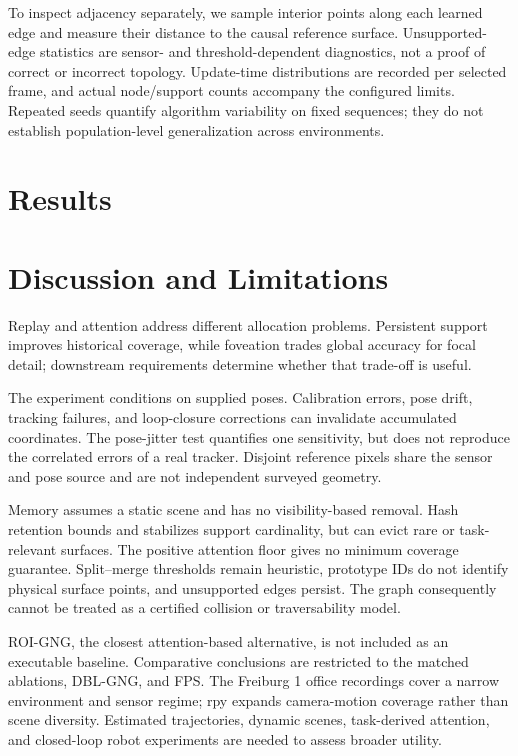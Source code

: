 \documentclass[letterpaper,10pt,conference]{template/ieeeconf}
\begin{document}
To inspect adjacency separately, we sample interior points along each learned edge and measure their distance to the causal reference surface. Unsupported-edge statistics are sensor- and threshold-dependent diagnostics, not a proof of correct or incorrect topology. Update-time distributions are recorded per selected frame, and actual node/support counts accompany the configured limits. Repeated seeds quantify algorithm variability on fixed sequences; they do not establish population-level generalization across environments.

\section{Results}


\section{Discussion and Limitations}
Replay and attention address different allocation problems. Persistent support improves historical coverage, while foveation trades global accuracy for focal detail; downstream requirements determine whether that trade-off is useful.

The experiment conditions on supplied poses. Calibration errors, pose drift, tracking failures, and loop-closure corrections can invalidate accumulated coordinates. The pose-jitter test quantifies one sensitivity, but does not reproduce the correlated errors of a real tracker. Disjoint reference pixels share the sensor and pose source and are not independent surveyed geometry.

Memory assumes a static scene and has no visibility-based removal. Hash retention bounds and stabilizes support cardinality, but can evict rare or task-relevant surfaces. The positive attention floor gives no minimum coverage guarantee. Split--merge thresholds remain heuristic, prototype IDs do not identify physical surface points, and unsupported edges persist. The graph consequently cannot be treated as a certified collision or traversability model.

ROI-GNG, the closest attention-based alternative, is not included as an executable baseline. Comparative conclusions are restricted to the matched ablations, DBL-GNG, and FPS. The Freiburg 1 office recordings cover a narrow environment and sensor regime; rpy expands camera-motion coverage rather than scene diversity. Estimated trajectories, dynamic scenes, task-derived attention, and closed-loop robot experiments are needed to assess broader utility.
\end{document}
